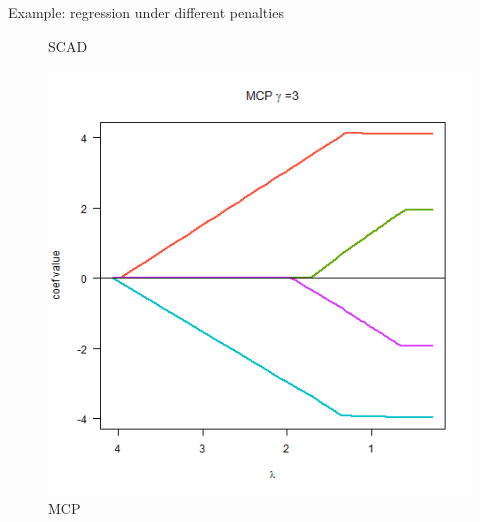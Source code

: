 \documentclass[11pt,compress,t,notes=noshow, xcolor=table]{beamer}
\begin{document}
\begin{vbframe}{Example: regression under different penalties}
\begin{figure}[h]
\begin{minipage}{0.32\linewidth}
      \caption{SCAD}
    \end{minipage}
    \begin{minipage}{0.32\linewidth}
      \vspace{3pt}
      \centerline{\includegraphics[width=\textwidth]{figure/other-pen-MCP.png}}
      \caption{MCP}
    \end{minipage}
  \end{figure}

\end{vbframe}
\end{document}
